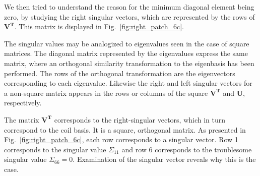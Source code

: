 

We then tried to understand the reason for the minimum diagonal element
being zero, by studying the right singular vectors, which are
represented by the rows of $\bm{V^T}$.  This matrix is displayed in
Fig.~\ref{fig:right_patch_6c}.

The singular values may be analogized to eigenvalues seen in the case
of square matrices. The diagonal matrix represented by the
eigenvalues express the same matrix, where an orthogonal similarity
transformation to the eigenbasis has been performed.  The rows of the
orthogonal transformation are the eigenvectors corresponding to each
eigenvalue.  Likewise the right and left singular vectors for a
non-square matrix appears in the rows or columns of the square
$\bm{V^T}$ and $\bm{U}$, respectively.

The matrix $\bm{V^T}$ corresponds to the right-singular vectors, which
in turn correspond to the coil basis.  It is a square, orthogonal
matrix.  As presented in Fig.~\ref{fig:right_patch_6c}, each row
corresponds to a singular vector.  Row 1 corresponds to the singular
value $\Sigma_{11}$ and row 6 corresponds to the troublesome singular
value $\Sigma_{66}=0$.  Examination of the singular vector reveals why
this is the case.

